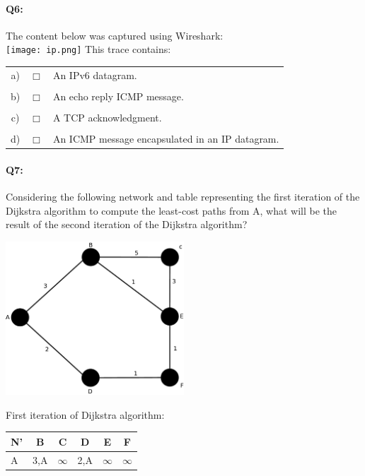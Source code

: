 \documentclass{llncs}
\begin{document}
\newpage
\paragraph{\textbf{Q6:}}
The content below was captured using
Wireshark:\\
\texttt{[image: ip.png]}
This trace contains:\\
\begin{tabular}{ccl}
  a) & $\Box$ & An IPv6 datagram.\\
  \\
  b) & $\Box$ & An echo reply ICMP message.\\
  \\
  c) & $\Box$ & A TCP acknowledgment.\\
  \\
  d) & $\Box$ & An ICMP message encapsulated in an IP datagram.\\
\end{tabular}


\newpage
\paragraph{\textbf{Q7}:}
Considering the following network and table representing the first iteration of the Dijkstra algorithm to compute the least-cost paths from A, what will be the result of the second iteration of the Dijkstra algorithm?

\includegraphics[width=0.5\textwidth]{graph.pdf}

First iteration of Dijkstra algorithm:\\
\begin{center}
    \begin{tabular}{l|c|c|c|c|c}
      N'     & B   & C        & D     & E        & F        \\
      \hline
      A      & 3,A & $\infty$ & 2,A   & $\infty$ & $\infty$ \\
    \end{tabular}
    \end{center}
\end{document}
